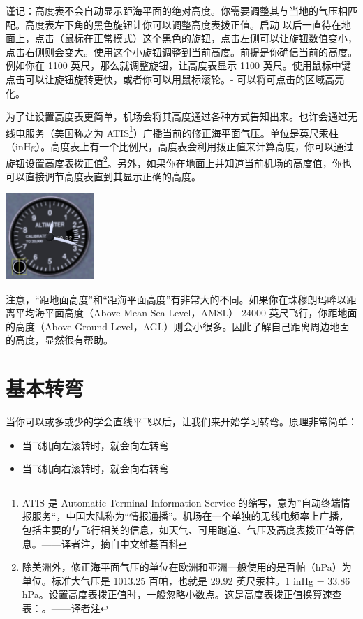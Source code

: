 谨记：高度表不会自动显示距海平面的绝对高度。你需要调整其与当地的气压相匹配。高度表左下角的黑色旋钮让你可以调整高度表拨正值。启动 \FlightGear{} 以后一直待在地面上，点击（鼠标在正常模式）这个黑色的旋钮，点击左侧可以让旋钮数值变小，点击右侧则会变大。使用这个小旋钮调整到当前高度。前提是你确信当前的高度。例如你在 1100 英尺，那么就调整旋钮，让高度表显示 1100 英尺。使用鼠标中键点击可以让旋钮旋转更快，或者你可以用鼠标滚轮。- 可以将可点击的区域高亮化。

为了让设置高度表更简单，机场会将其高度通过各种方式告知出来。也许会通过无线电服务（美国称之为 ATIS\footnote{ATIS 是 Automatic Terminal Information Service 的缩写，意为”自动终端情报服务“，中国大陆称为“情报通播”。机场在一个单独的无线电频率上广播，包括主要的与飞行相关的信息，如天气、可用跑道、气压及高度表拨正值等信息。——译者注，摘自中文维基百科}）广播当前的修正海平面气压。单位是英尺汞柱（inHg）。高度表上有一个比例尺，高度表会利用拨正值来计算高度，你可以通过旋钮设置高度表拨正值\footnote{除美洲外，修正海平面气压的单位在欧洲和亚洲一般使用的是百帕（hPa）为单位。标准大气压是 1013.25 百帕，也就是 29.92 英尺汞柱。1 inHg = 33.86 hPa。设置高度表拨正值时，一般忽略小数点。这是高度表拨正值换算速查表：。——译者注}。另外，如果你在地面上并知道当前机场的高度值，你也可以直接调节高度表直到其显示正确的高度。

\begin{center}
\includegraphics[width=0.25\textwidth]{img/tut_18}
\end{center}

注意，“距地面高度”和“距海平面高度”有非常大的不同。如果你在珠穆朗玛峰以距离平均海平面高度（Above Mean Sea Level，AMSL） 24000 英尺飞行，你距地面的高度（Above Ground Level，AGL）则会小很多。因此了解自己距离周边地面的高度，显然很有帮助。

\section{基本转弯}
\label{sec:InFlightTurning}

当你可以或多或少的学会直线平飞以后，让我们来开始学习转弯。原理非常简单：
\begin{itemize}
    \item 当飞机向左滚转时，就会向左转弯
    \item 当飞机向右滚转时，就会向右转弯
\end{itemize}

